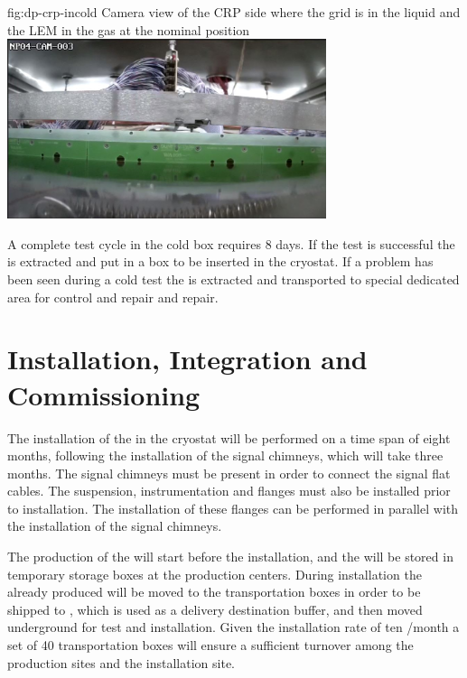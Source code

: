 \begin{dunefigure}
{fig:dp-crp-incold}
{Camera view of the CRP side where the grid is in the liquid and the LEM in the gas at the nominal position}
\includegraphics[width=0.7\textwidth]{graphics/camera3}
\end{dunefigure}

A  complete  test cycle in the cold box requires \num{8} days.
If the test is successful the  is extracted and put in a box to be inserted in the cryostat. If a problem has been seen  during a cold test the  is extracted and transported to special dedicated area for control and repair and repair. 
\section{Installation, Integration and Commissioning}
\label{sec:dp-crp-install}
The installation of the  in the cryostat will be performed on a time span of eight  months, following the installation of the signal chimneys, which will take three months. The signal chimneys must be present in order to 
connect the  signal flat cables. The suspension, instrumentation and  flanges must also be  installed prior to  installation. The installation of these flanges can be performed in parallel with the installation of the signal chimneys. 

The production of the  will start before the installation, and the  will be stored in temporary storage boxes at the production centers. During installation the already produced  will be moved to the transportation boxes in order to be shipped to , which is used as a delivery destination buffer, and then  moved underground for test and installation. Given the installation rate of ten /month a set of \num{40} transportation boxes will ensure a sufficient turnover among the production sites and the installation site.

